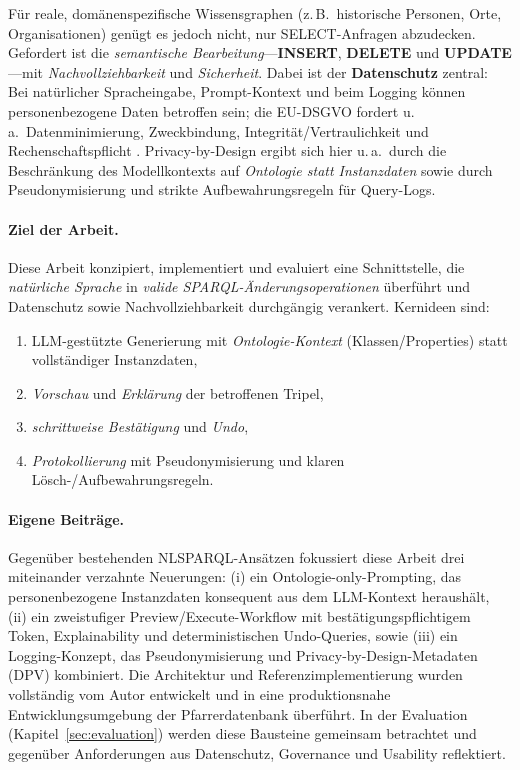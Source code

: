 Für reale, domänenspezifische Wissensgraphen (z.\,B.\ historische Personen, Orte, Organisationen) genügt es jedoch nicht, nur SELECT-Anfragen abzudecken. Gefordert ist die \emph{semantische Bearbeitung}—\textbf{INSERT}, \textbf{DELETE} und \textbf{UPDATE}—mit \emph{Nachvollziehbarkeit} und \emph{Sicherheit}. Dabei ist der \textbf{Datenschutz} zentral: Bei natürlicher Spracheingabe, Prompt-Kontext und beim Logging können personenbezogene Daten betroffen sein; die EU-DSGVO fordert u.\,a.\ Datenminimierung, Zweckbindung, Integrität/Vertraulichkeit und Rechenschaftspflicht \cite{euGDPR2016}. Privacy-by-Design ergibt sich hier u.\,a.\ durch die Beschränkung des Modellkontexts auf \emph{Ontologie statt Instanzdaten} sowie durch Pseudo\-nymisierung und strikte Aufbewahrungsregeln für Query-Logs.

\paragraph{Ziel der Arbeit.}
Diese Arbeit konzipiert, implementiert und evaluiert eine Schnittstelle, die \emph{natürliche Sprache} in \emph{valide SPARQL-Änderungsoperationen} überführt und Datenschutz sowie Nachvollziehbarkeit durchgängig verankert. Kernideen sind:
\begin{enumerate}
\item LLM-gestützte Generierung mit \emph{Ontologie-Kontext} (Klassen/Properties) statt vollständiger Instanzdaten,
\item \emph{Vorschau} und \emph{Erklärung} der betroffenen Tripel,
\item \emph{schrittweise Bestätigung} und \emph{Undo},
\item \emph{Protokollierung} mit Pseudonymisierung und klaren Lösch-/Aufbewahrungsregeln.
\end{enumerate}

\paragraph{Eigene Beiträge.}
Gegenüber bestehenden NL{\textrightarrow}SPARQL-Ansätzen fokussiert diese Arbeit drei miteinander verzahnte Neuerungen: (i) ein Ontologie-only-Prompting, das personenbezogene Instanzdaten konsequent aus dem LLM-Kontext heraushält, (ii) ein zweistufiger Preview/Execute-Workflow mit bestätigungspflichtigem Token, Explainability und deterministischen Undo-Queries, sowie (iii) ein Logging-Konzept, das Pseudonymisierung und Privacy-by-Design-Metadaten (DPV) kombiniert. Die Architektur und Referenzimplementierung wurden vollständig vom Autor entwickelt und in eine produktionsnahe Entwicklungsumgebung der Pfarrerdatenbank überführt. In der Evaluation (Kapitel~\ref{sec:evaluation}) werden diese Bausteine gemeinsam betrachtet und gegenüber Anforderungen aus Datenschutz, Governance und Usability reflektiert.

